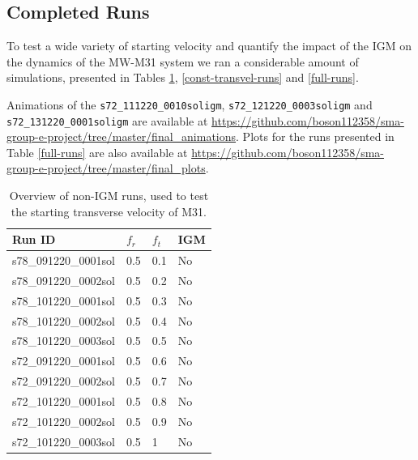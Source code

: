 \documentclass[a4paper,12pt, english]{article}
\begin{document}
\subsection{Completed Runs}
\label{completed-runs}
To test a wide variety of starting velocity and quantify the impact of the IGM on the dynamics of the MW-M31 system we ran a considerable amount of simulations, presented in Tables \ref{const-radvel-runs}, \ref{const-transvel-runs} and \ref{full-runs}.\par
\smallskip
Animations of the \texttt{s72\_111220\_0010soligm}, \texttt{s72\_121220\_0003soligm} and \texttt{s72\_131220\_0001soligm} are available at \url{https://github.com/boson112358/sma-group-e-project/tree/master/final_animations}. Plots for the runs presented in Table \ref{full-runs} are also available at \url{https://github.com/boson112358/sma-group-e-project/tree/master/final_plots}.\par
\begin{table}[!h]
\centering
\begin{tabular}{@{}l|l|l|l@{}}
\toprule
Run ID               & \(f_{r}\) & \(f_{t}\) & IGM \\ \midrule
s78\_091220\_0001sol & 0.5       & 0.1       & No  \\
s78\_091220\_0002sol & 0.5       & 0.2       & No  \\
s78\_101220\_0001sol & 0.5       & 0.3       & No  \\
s78\_101220\_0002sol & 0.5       & 0.4       & No  \\
s78\_101220\_0003sol & 0.5       & 0.5       & No  \\
s72\_091220\_0001sol & 0.5       & 0.6       & No  \\
s72\_091220\_0002sol & 0.5       & 0.7       & No  \\
s72\_101220\_0001sol & 0.5       & 0.8       & No  \\
s72\_101220\_0002sol & 0.5       & 0.9       & No  \\
s72\_101220\_0003sol & 0.5       & 1         & No  \\ \bottomrule
\end{tabular}
\caption{Overview of non-IGM runs, used to test the starting transverse velocity of M31.}
\label{const-radvel-runs}
\end{table}\par
\end{document}
